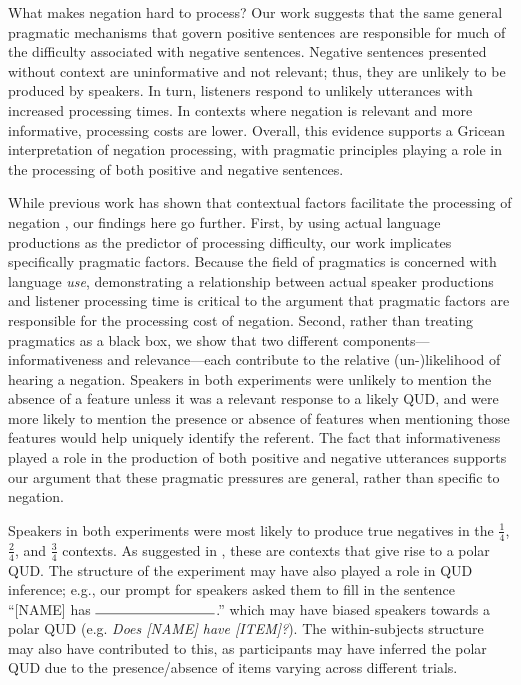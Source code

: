 \documentclass[man, floatsintext, noapacite]{apa6}
\begin{document}
What makes negation hard to process? Our work suggests that the same general pragmatic mechanisms that govern positive sentences are responsible for much of the difficulty associated with negative sentences. Negative sentences presented without context are uninformative and not relevant; thus, they are unlikely to be produced by speakers. In turn, listeners respond to unlikely utterances with increased processing times. In contexts where negation is relevant and more informative, processing costs are lower. Overall, this evidence supports a Gricean interpretation of negation processing, with pragmatic principles playing a role in the processing of both positive and negative sentences.

While previous work has shown that contextual factors facilitate the processing of negation \cite{wason1965,nieuwland2008,dale2011,orenes2014}, our findings here go further. First, by using actual language productions as the predictor of processing difficulty, our work implicates specifically pragmatic factors. Because the field of pragmatics is concerned with language \textit{use}, demonstrating a relationship between actual speaker productions and listener processing time is critical to the argument that pragmatic factors are responsible for the processing cost of negation. Second, rather than treating pragmatics as a black box, we show that two different components---informativeness and relevance---each contribute to the relative (un-)likelihood of hearing a negation. Speakers in both experiments were unlikely to mention the absence of a feature unless it was a relevant response to a likely QUD, and were more likely to mention the presence or absence of features when mentioning those features would help uniquely identify the referent. The fact that informativeness played a role in the production of both positive and negative utterances supports our argument that these pragmatic pressures are general, rather than specific to negation. 

Speakers in both experiments were most likely to produce true negatives in the $\frac{1}{4}$, $\frac{2}{4}$, and $\frac{3}{4}$ contexts. As suggested in , these are contexts that give rise to a polar QUD. The structure of the experiment may have also played a role in QUD inference; e.g., our prompt for speakers asked them to fill in the sentence ``[NAME] has $\rule{3cm}{0.15mm}$.'' which may have biased speakers towards a polar QUD (e.g. \textit{Does [NAME] have [ITEM]?}). The within-subjects structure may also have contributed to this, as participants may have inferred the polar QUD due to the presence/absence of items varying across different trials.
\end{document}
